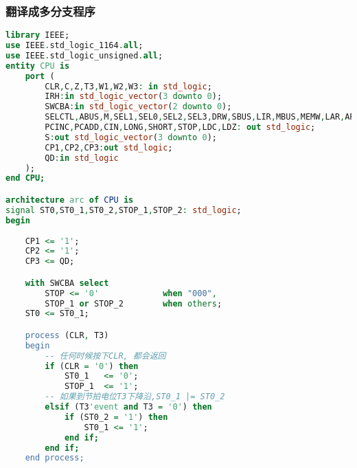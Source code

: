 \documentclass[UTF8]{ctexart}
\begin{document}
\subsubsection{翻译成多分支程序}
{\firacode
\begin{lstlisting}[language={VHDL}]
library IEEE;
use IEEE.std_logic_1164.all;
use IEEE.std_logic_unsigned.all;
entity CPU is
	port (
		CLR,C,Z,T3,W1,W2,W3: in std_logic;
		IRH:in std_logic_vector(3 downto 0);
		SWCBA:in std_logic_vector(2 downto 0);
		SELCTL,ABUS,M,SEL1,SEL0,SEL2,SEL3,DRW,SBUS,LIR,MBUS,MEMW,LAR,ARINC,LPC,
		PCINC,PCADD,CIN,LONG,SHORT,STOP,LDC,LDZ: out std_logic;
		S:out std_logic_vector(3 downto 0);
		CP1,CP2,CP3:out std_logic;	
		QD:in std_logic	
	);
end CPU;

architecture arc of CPU is
signal ST0,ST0_1,ST0_2,STOP_1,STOP_2: std_logic;
begin
	
	CP1 <= '1';
	CP2 <= '1';
	CP3 <= QD;

	with SWCBA select
		STOP <= '0'             when "000",
		STOP_1 or STOP_2        when others;
	ST0 <= ST0_1;

	process (CLR, T3)
	begin
		-- 任何时候按下CLR, 都会返回
		if (CLR = '0') then
			ST0_1	<= '0';
			STOP_1	<= '1';
		-- 如果到节拍电位T3下降沿,ST0_1 |= ST0_2
		elsif (T3'event and T3 = '0') then
			if (ST0_2 = '1') then
				ST0_1 <= '1';
			end if;
		end if;
	end process;


\end{lstlisting}}
\end{document}

